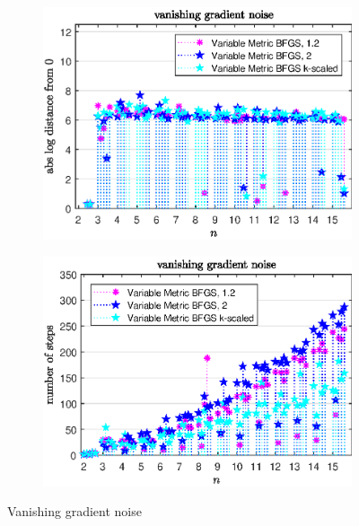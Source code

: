 \begin{figure}[H]
	\begin{subfigure}{0.49\textwidth}
		\includegraphics[width=\textwidth]{Pictures/Plots/vanishing_gradient_noise_comp.eps}%
	\end{subfigure}
	\begin{subfigure}{0.49\textwidth}
		\includegraphics[width=\textwidth]{Pictures/Plots/steps_vanishing_gradient_noise_comp.eps}%
	\end{subfigure}
	\caption{Vanishing gradient noise}%
	\label{fig_van_grad_noise_comp}%
\end{figure}



